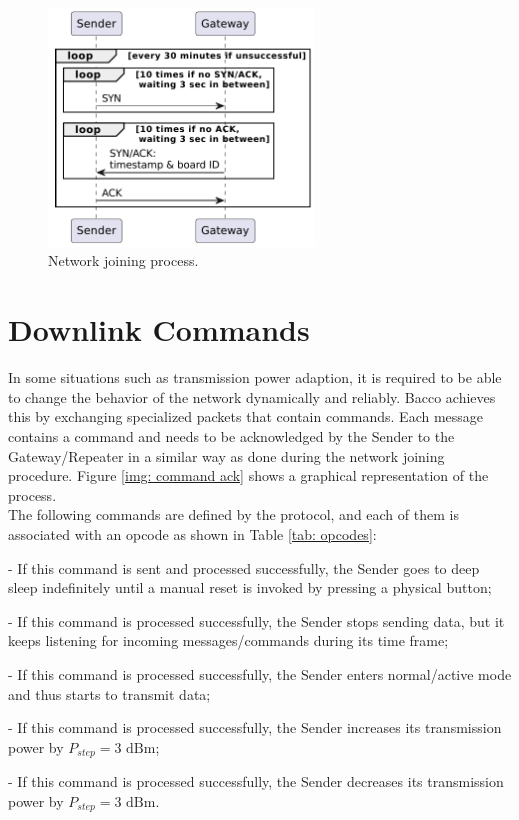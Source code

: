 \begin{figure}[ht]
    \centering
    \includegraphics[width=200pt]{uml/network_joining.pdf}
    \caption{Network joining process.}
    \label{img: network joining}
\end{figure}

\section{Downlink Commands}
In some situations such as transmission power adaption, it is required to be able to change the behavior of the
network dynamically and reliably. Bacco achieves this by exchanging specialized packets that contain
commands. Each message contains a command and needs to be acknowledged by the Sender to the Gateway/Repeater in a similar way as done during the
network joining procedure. Figure \ref{img: command ack} shows a graphical representation of the process.\\
The following commands are defined by the protocol, and each of them is associated with an opcode as shown in Table
\ref{tab: opcodes}:
\begin{description}[font=$\bullet$~\normalfont\scshape\color{blue!50!black}]
    \item [Shutdown] - If this command is sent and processed successfully, the Sender goes to deep sleep indefinitely until a
        manual reset is invoked by pressing a physical button;
    \item [Enter sleep mode] - If this command is processed successfully, the Sender stops sending data, but it keeps
        listening for incoming messages/commands during its time frame;
    \item [Wakeup] - If this command is processed successfully, the Sender enters normal/active mode
        and thus starts to transmit data;
    \item [Increase transmission power] - If this command is processed successfully, the Sender increases its
        transmission power by $P_{step}= 3 \text{ dBm}$;
    \item [Decrease transmission power] - If this command is processed successfully, the Sender decreases its
        transmission power by $P_{step}= 3 \text{ dBm}$.
\end{description}


